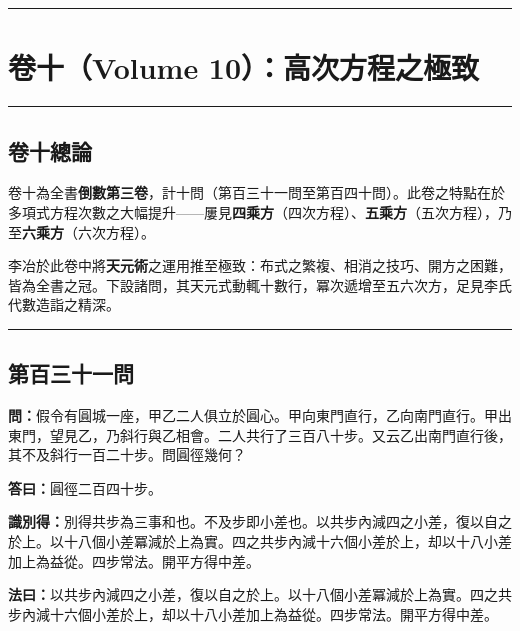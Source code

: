 \documentclass[11pt,a4paper]{article}
\newcommand{\longline}{\noindent\rule{\textwidth}{0.4pt}}
\newcommand{\wen}[1]{\par\noindent\textbf{\textcolor{probcolor}{問：}}{#1}\par}
\newcommand{\da}[1]{\par\noindent\textbf{\textcolor{anscolor}{答曰：}}{#1}\par}
\newcommand{\fayue}[1]{\par\noindent\textbf{\textcolor{methodcolor}{法曰：}}{#1}\par}
\newcommand{\zhi}[1]{\par\noindent\textbf{識別得：}{#1}\par}
\begin{document}
\vspace{0.5cm}
\begin{center}
\longline
\end{center}

\newpage

\section{卷十（Volume 10）：高次方程之極致}
\label{sec:vol10}

\longline

\subsection*{卷十總論}

卷十為全書\textbf{倒數第三卷}，計十問（第百三十一問至第百四十問）。此卷之特點在於多項式方程次數之大幅提升——屢見\textbf{四乘方}（四次方程）、\textbf{五乘方}（五次方程），乃至\textbf{六乘方}（六次方程）。

李冶於此卷中將\textbf{天元術}之運用推至極致：布式之繁複、相消之技巧、開方之困難，皆為全書之冠。下設諸問，其天元式動輒十數行，冪次遞增至五六次方，足見李氏代數造詣之精深。

\vspace{0.5cm}
\longline

\subsection*{第百三十一問}
\wen{假令有圓城一座，甲乙二人俱立於圓心。甲向東門直行，乙向南門直行。甲出東門，望見乙，乃斜行與乙相會。二人共行了三百八十步。又云乙出南門直行後，其不及斜行一百二十步。問圓徑幾何？}

\da{圓徑二百四十步。}

\zhi{別得共步為三事和也。不及步即小差也。以共步內減四之小差，復以自之於上。以十八個小差冪減於上為實。四之共步內減十六個小差於上，却以十八小差加上為益從。四步常法。開平方得中差。}

\fayue{以共步內減四之小差，復以自之於上。以十八個小差冪減於上為實。四之共步內減十六個小差於上，却以十八小差加上為益從。四步常法。開平方得中差。}
\end{document}
